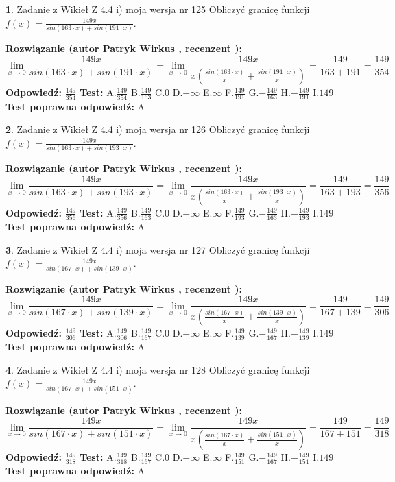 \documentclass[12pt, a4paper]{article}
\theoremstyle{definition} %
\newtheorem{zad}{}
\newcommand{\zadStart}[1]{\begin{zad}#1\newline}
\newcommand{\zadStop}{\end{zad}}
\newcommand{\rozwStart}[2]{\noindent \textbf{Rozwiązanie (autor #1 , recenzent #2): }\newline}
\newcommand{\rozwStop}{\newline}
\newcommand{\odpStart}{\noindent \textbf{Odpowiedź:}\newline}
\newcommand{\odpStop}{\newline}
\newcommand{\testStart}{\noindent \textbf{Test:}\newline}
\newcommand{\testStop}{\newline}
\newcommand{\kluczStart}{\noindent \textbf{Test poprawna odpowiedź:}\newline}
\newcommand{\kluczStop}{\newline}
\begin{document}
\zadStart{Zadanie z Wikieł Z 4.4 i) moja wersja nr 125}
Obliczyć granicę funkcji $f(x)=\frac{149x}{sin(163\cdot x) +sin(191\cdot x)}$.
\zadStop
\rozwStart{Patryk Wirkus}{}
$$\lim\limits_{x\to 0}\frac{149x}{sin(163\cdot x) +sin(191\cdot x)}=\lim\limits_{x\to 0}\frac{149x}{x(\frac{sin(163\cdot x)}{x}+\frac{sin(191\cdot x)}{x})}=\frac{149}{163+191} = \frac{149}{354}$$
\rozwStop
\odpStart
$\frac{149}{354}$
\odpStop
\testStart
A.$\frac{149}{354}$
B.$\frac{149}{163}$
C.$0$
D.$-\infty$
E.$\infty$
F.$\frac{149}{191}$
G.$-\frac{149}{163}$
H.$-\frac{149}{191}$
I.$149$
\testStop
\kluczStart
A
\kluczStop



\zadStart{Zadanie z Wikieł Z 4.4 i) moja wersja nr 126}
Obliczyć granicę funkcji $f(x)=\frac{149x}{sin(163\cdot x) +sin(193\cdot x)}$.
\zadStop
\rozwStart{Patryk Wirkus}{}
$$\lim\limits_{x\to 0}\frac{149x}{sin(163\cdot x) +sin(193\cdot x)}=\lim\limits_{x\to 0}\frac{149x}{x(\frac{sin(163\cdot x)}{x}+\frac{sin(193\cdot x)}{x})}=\frac{149}{163+193} = \frac{149}{356}$$
\rozwStop
\odpStart
$\frac{149}{356}$
\odpStop
\testStart
A.$\frac{149}{356}$
B.$\frac{149}{163}$
C.$0$
D.$-\infty$
E.$\infty$
F.$\frac{149}{193}$
G.$-\frac{149}{163}$
H.$-\frac{149}{193}$
I.$149$
\testStop
\kluczStart
A
\kluczStop



\zadStart{Zadanie z Wikieł Z 4.4 i) moja wersja nr 127}
Obliczyć granicę funkcji $f(x)=\frac{149x}{sin(167\cdot x) +sin(139\cdot x)}$.
\zadStop
\rozwStart{Patryk Wirkus}{}
$$\lim\limits_{x\to 0}\frac{149x}{sin(167\cdot x) +sin(139\cdot x)}=\lim\limits_{x\to 0}\frac{149x}{x(\frac{sin(167\cdot x)}{x}+\frac{sin(139\cdot x)}{x})}=\frac{149}{167+139} = \frac{149}{306}$$
\rozwStop
\odpStart
$\frac{149}{306}$
\odpStop
\testStart
A.$\frac{149}{306}$
B.$\frac{149}{167}$
C.$0$
D.$-\infty$
E.$\infty$
F.$\frac{149}{139}$
G.$-\frac{149}{167}$
H.$-\frac{149}{139}$
I.$149$
\testStop
\kluczStart
A
\kluczStop



\zadStart{Zadanie z Wikieł Z 4.4 i) moja wersja nr 128}
Obliczyć granicę funkcji $f(x)=\frac{149x}{sin(167\cdot x) +sin(151\cdot x)}$.
\zadStop
\rozwStart{Patryk Wirkus}{}
$$\lim\limits_{x\to 0}\frac{149x}{sin(167\cdot x) +sin(151\cdot x)}=\lim\limits_{x\to 0}\frac{149x}{x(\frac{sin(167\cdot x)}{x}+\frac{sin(151\cdot x)}{x})}=\frac{149}{167+151} = \frac{149}{318}$$
\rozwStop
\odpStart
$\frac{149}{318}$
\odpStop
\testStart
A.$\frac{149}{318}$
B.$\frac{149}{167}$
C.$0$
D.$-\infty$
E.$\infty$
F.$\frac{149}{151}$
G.$-\frac{149}{167}$
H.$-\frac{149}{151}$
I.$149$
\testStop
\kluczStart
A
\kluczStop
\end{document}
